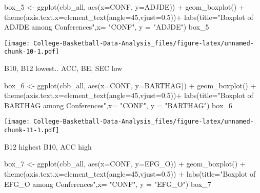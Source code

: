 \documentclass[
]{article}
\newenvironment{Shaded}{\begin{snugshade}}{\end{snugshade}}
\newcommand{\AttributeTok}[1]{\textcolor[rgb]{0.77,0.63,0.00}{#1}}
\newcommand{\DecValTok}[1]{\textcolor[rgb]{0.00,0.00,0.81}{#1}}
\newcommand{\FloatTok}[1]{\textcolor[rgb]{0.00,0.00,0.81}{#1}}
\newcommand{\FunctionTok}[1]{\textcolor[rgb]{0.00,0.00,0.00}{#1}}
\newcommand{\NormalTok}[1]{#1}
\newcommand{\OtherTok}[1]{\textcolor[rgb]{0.56,0.35,0.01}{#1}}
\newcommand{\SpecialCharTok}[1]{\textcolor[rgb]{0.00,0.00,0.00}{#1}}
\newcommand{\StringTok}[1]{\textcolor[rgb]{0.31,0.60,0.02}{#1}}
\begin{document}
\begin{Shaded}
\begin{Highlighting}[]
\NormalTok{box\_5 }\OtherTok{\textless{}{-}} \FunctionTok{ggplot}\NormalTok{(cbb\_all, }\FunctionTok{aes}\NormalTok{(}\AttributeTok{x=}\NormalTok{CONF, }\AttributeTok{y=}\NormalTok{ADJDE)) }\SpecialCharTok{+} \FunctionTok{geom\_boxplot}\NormalTok{() }\SpecialCharTok{+} \FunctionTok{theme}\NormalTok{(}\AttributeTok{axis.text.x=}\FunctionTok{element\_text}\NormalTok{(}\AttributeTok{angle=}\DecValTok{45}\NormalTok{,}\AttributeTok{vjust=}\FloatTok{0.5}\NormalTok{))}\SpecialCharTok{+} \FunctionTok{labs}\NormalTok{(}\AttributeTok{title=}\StringTok{"Boxplot of ADJDE among Conferences"}\NormalTok{,}\AttributeTok{x=} \StringTok{"CONF"}\NormalTok{, }\AttributeTok{y =} \StringTok{"ADJDE"}\NormalTok{)}
\NormalTok{box\_5}
\end{Highlighting}
\end{Shaded}

\texttt{[image: College-Basketball-Data-Analysis\_files/figure-latex/unnamed-chunk-10-1.pdf]}

B10, B12 lowest.. ACC, BE, SEC low

\begin{Shaded}
\begin{Highlighting}[]
\NormalTok{box\_6 }\OtherTok{\textless{}{-}} \FunctionTok{ggplot}\NormalTok{(cbb\_all, }\FunctionTok{aes}\NormalTok{(}\AttributeTok{x=}\NormalTok{CONF, }\AttributeTok{y=}\NormalTok{BARTHAG)) }\SpecialCharTok{+} \FunctionTok{geom\_boxplot}\NormalTok{() }\SpecialCharTok{+} \FunctionTok{theme}\NormalTok{(}\AttributeTok{axis.text.x=}\FunctionTok{element\_text}\NormalTok{(}\AttributeTok{angle=}\DecValTok{45}\NormalTok{,}\AttributeTok{vjust=}\FloatTok{0.5}\NormalTok{))}\SpecialCharTok{+} \FunctionTok{labs}\NormalTok{(}\AttributeTok{title=}\StringTok{"Boxplot of BARTHAG among Conferences"}\NormalTok{,}\AttributeTok{x=} \StringTok{"CONF"}\NormalTok{, }\AttributeTok{y =} \StringTok{"BARTHAG"}\NormalTok{)}
\NormalTok{box\_6}
\end{Highlighting}
\end{Shaded}

\texttt{[image: College-Basketball-Data-Analysis\_files/figure-latex/unnamed-chunk-11-1.pdf]}

B12 highest B10, ACC high

\begin{Shaded}
\begin{Highlighting}[]
\NormalTok{box\_7 }\OtherTok{\textless{}{-}} \FunctionTok{ggplot}\NormalTok{(cbb\_all, }\FunctionTok{aes}\NormalTok{(}\AttributeTok{x=}\NormalTok{CONF, }\AttributeTok{y=}\NormalTok{EFG\_O)) }\SpecialCharTok{+} \FunctionTok{geom\_boxplot}\NormalTok{() }\SpecialCharTok{+} \FunctionTok{theme}\NormalTok{(}\AttributeTok{axis.text.x=}\FunctionTok{element\_text}\NormalTok{(}\AttributeTok{angle=}\DecValTok{45}\NormalTok{,}\AttributeTok{vjust=}\FloatTok{0.5}\NormalTok{)) }\SpecialCharTok{+} \FunctionTok{labs}\NormalTok{(}\AttributeTok{title=}\StringTok{"Boxplot of EFG\_O among Conferences"}\NormalTok{,}\AttributeTok{x=} \StringTok{"CONF"}\NormalTok{, }\AttributeTok{y =} \StringTok{"EFG\_O"}\NormalTok{)}
\NormalTok{box\_7}
\end{Highlighting}
\end{Shaded}
\end{document}

